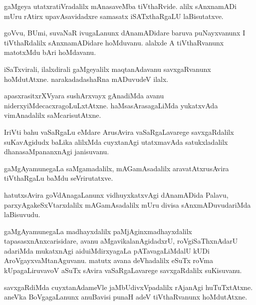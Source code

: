 \documentclass{article}
\begin{document}
\begin{mn}
gaMgeya utatxratiVradalilx mAnasaveMba tiVthaRvide. alilx sAnxnamADi mUru rAtirx upavAsavidadxre 
samasatx iSATxthaRgaLU laBisutatxve.
\end{mn}

\begin{mn}
goVvu, BUmi, suvaNaR ivugaLanunx dAnamADidare  baruva puNayxvanunx I tiVthaRdalilx sAnxnamADidare 
hoMduvanu. alalxde A tiVthaRvanunx matotxMdu bAri hoMdavanu.
\end{mn}

\begin{mn}
iSaTxvirali, ilalxdirali gaMgeyalilx maqtanAdavanu savxgaRvanunx hoMdutAtxne. narakadadashaRna 
mADuvudeV ilalx.
\end{mn}

\begin{mn}
apasxrasitxrXVyara sushArxvayx gAnadiMda avanu niderxyiMdecacxragoLuLxtAtxne. haMsasArasagaLiMda 
yukatxvAda vimAnadalilx saMcarisutAtxne.
\end{mn}

\begin{mn}
IriVti bahu vaSaRgaLu eMdare ArusAvira vaSaRgaLavarege savxgaRdalilx suKavAgidudx baLika alilxMda
cuyxtanAgi utatxmavAda satukxladalilx dhanasaMpananxnAgi janisuvanu.
\end{mn}

\begin{mn}
gaMgAyamunegaLa saMgamadalilx, mAGamAsadalilx aravatAtxrusAvira tiVthaRgaLu baMdu seVrirutatxve.
\end{mn}

\begin{mn}
hatutxsAvira goVdAnagaLanunx vidhuyxkatxvAgi dAnamADida Palavu, parxyAgakeSxVtarxdalilx 
mAGamAsadalilx mUru divisa sAnxmADuvudariMda laBisuvudu.
\end{mn}

\begin{mn}
gaMgAyamunegaLa madhayxdalilx paMjAginxmadhayxdalilx tapasasxnAnxcarisidare, avanu 
aMgavikalanAgidadxrU, roVgiSaThxnAdarU adariMda mukatxnAgi aiduiMdirxyagaLa pATavagaLiMdalU kUDi
AroVgayxvaMtanAguvanu. matutx avana deVhadalilx eSuTx roVma kUpagaLiruvavoV aSuTx sAvira 
vaSaRgaLavarege savxgaRdalilx suKisuvanu.
\end{mn}

\begin{mn}
savxgaRdiMda cuyxtanAdameVle jaMbUdivxVpadalilx rAjanAgi huTuTxtAtxne. aneVka BoVgagaLanunx 
anuBavisi punaH adeV tiVthaRvanunx hoMdutAtxne.
\end{mn}
\end{document}
